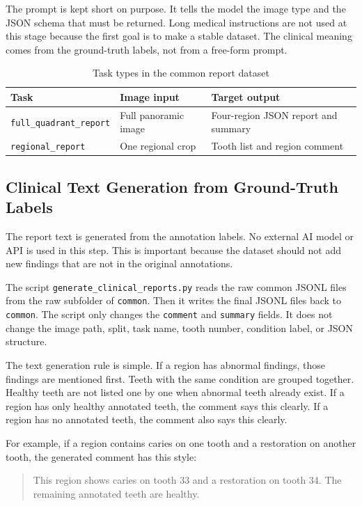 \documentclass[a4paper,12pt]{report}
\begin{document}
The prompt is kept short on purpose. It tells the model the image type and the JSON schema that must be returned. Long medical instructions are not used at this stage because the first goal is to make a stable dataset. The clinical meaning comes from the ground-truth labels, not from a free-form prompt.

\begin{table}[H]
\centering
\caption{Task types in the common report dataset}
\begin{tabular}{llp{5.6cm}}
\toprule
Task & Image input & Target output \\
\midrule
\texttt{full\_quadrant\_report} & Full panoramic image & Four-region JSON report and summary \\
\texttt{regional\_report} & One regional crop & Tooth list and region comment \\
\bottomrule
\end{tabular}
\end{table}


\subsection{Clinical Text Generation from Ground-Truth Labels}

The report text is generated from the annotation labels. No external AI model or API is used in this step. This is important because the dataset should not add new findings that are not in the original annotations.

The script \texttt{generate\_clinical\_reports.py} reads the raw common JSONL files from the raw subfolder of \texttt{common}. Then it writes the final JSONL files back to \texttt{common}. The script only changes the \texttt{comment} and \texttt{summary} fields. It does not change the image path, split, task name, tooth number, condition label, or JSON structure.

The text generation rule is simple. If a region has abnormal findings, those findings are mentioned first. Teeth with the same condition are grouped together. Healthy teeth are not listed one by one when abnormal teeth already exist. If a region has only healthy annotated teeth, the comment says this clearly. If a region has no annotated teeth, the comment also says this clearly.

For example, if a region contains caries on one tooth and a restoration on another tooth, the generated comment has this style:

\begin{quote}
This region shows caries on tooth 33 and a restoration on tooth 34. The remaining annotated teeth are healthy.
\end{quote}
\end{document}
